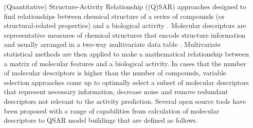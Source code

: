 (Quantitative) Structure-Activity Relationship ((Q)SAR) approaches designed to find relationships between chemical structure of a series of compounds (or structural-related properties) and a biological activity \cite{1995}. Molecular descriptors are representative measures of chemical structures that encode structure information and usually arranged in a two-way multivariate data table \cite{Consonni_2009}. Multivariate statistical methods are then applied to make a mathematical relationship between a matrix of molecular features and a biological activity. In cases that the number of molecular descriptors is higher than the number of compounds, variable selection approaches come up to optimally select a subset of molecular descriptors that represent necessary information, decrease noise and remove redundant descriptors not relevant to the activity prediction. Several open source tools have been proposed with a range of capabilities from calculation of molecular descriptors to QSAR model buildings that are defined as follows. 